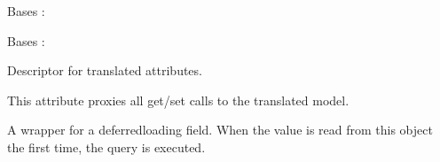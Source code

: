\documentclass[letterpaper,10pt,french]{sphinxmanual}
\begin{document}
\begin{fulllineitems}
\begin{fulllineitems}
\end{fulllineitems}


\begin{fulllineitems}
\label{\detokenize{index:core.models.LaundryInfo.DoesNotExist}}
\pysigstartsignatures
\pysigline
{}
\pysigstopsignatures
\sphinxAtStartPar
Bases : 

\end{fulllineitems}


\begin{fulllineitems}
\label{\detokenize{index:core.models.LaundryInfo.MultipleObjectsReturned}}
\pysigstartsignatures
\pysigline
{}
\pysigstopsignatures
\sphinxAtStartPar
Bases : 

\end{fulllineitems}


\begin{fulllineitems}
\label{\detokenize{index:core.models.LaundryInfo.dryer_price}}
\pysigstartsignatures
\pysigline
{}
\pysigstopsignatures
\sphinxAtStartPar
Descriptor for translated attributes.

\sphinxAtStartPar
This attribute proxies all get/set calls to the translated model.

\end{fulllineitems}


\begin{fulllineitems}
\label{\detokenize{index:core.models.LaundryInfo.id}}
\pysigstartsignatures
\pysigline
{}
\pysigstopsignatures
\sphinxAtStartPar
A wrapper for a deferred\sphinxhyphen{}loading field. When the value is read from this
object the first time, the query is executed.


\end{fulllineitems}
\end{fulllineitems}
\end{document}
